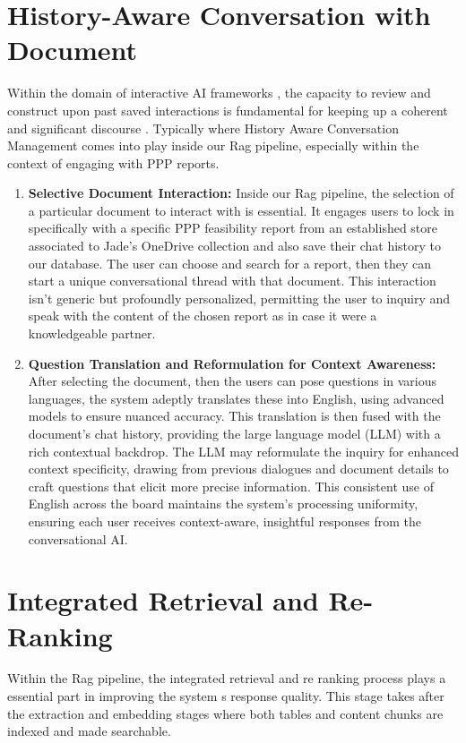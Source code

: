 \section{History-Aware Conversation with Document}
Within the domain of interactive AI frameworks , the capacity to review and construct upon past saved interactions is fundamental for keeping up a coherent and significant discourse . Typically where History Aware Conversation Management comes into play inside our Rag pipeline, especially within the context of engaging with PPP reports.
\vskip 0.5cm
\begin{enumerate}
    \item \textbf{Selective Document Interaction:} Inside our Rag pipeline, the selection of a particular document to interact with is essential. It engages users to lock in specifically with a specific PPP feasibility report from an established store associated to Jade's OneDrive collection and also save their chat history to our database. The user can choose and search for a report, then they can start a unique conversational thread with that document. This interaction isn't generic but profoundly personalized, permitting the user to inquiry and speak with the content of the chosen report as in case it were a knowledgeable partner. 
    \vskip 0.5cm
    \item \textbf{Question Translation and Reformulation for Context Awareness:} After selecting the document, then the users can pose questions in various languages, the system adeptly translates these into English, using advanced models to ensure nuanced accuracy. This translation is then fused with the document's chat history, providing the large language model (LLM) with a rich contextual backdrop. The LLM may reformulate the inquiry for enhanced context specificity, drawing from previous dialogues and document details to craft questions that elicit more precise information. This consistent use of English across the board maintains the system's processing uniformity, ensuring each user receives context-aware, insightful responses from the conversational AI.
\end{enumerate}

\section{Integrated Retrieval and Re-Ranking}
Within the Rag pipeline, the integrated retrieval and re ranking process plays a essential part in improving the system s response quality. This stage takes after the extraction and embedding stages where both tables and content chunks are indexed and made searchable.
